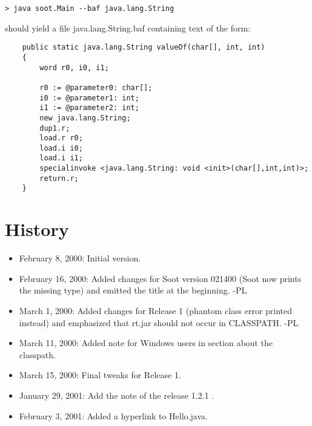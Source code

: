 \documentclass{article}
\begin{document}
\begin{verbatim}
> java soot.Main --baf java.lang.String
\end{verbatim}

should yield a file java.lang.String.baf containing text of the form:

\begin{verbatim}
    public static java.lang.String valueOf(char[], int, int)
    {
        word r0, i0, i1;

        r0 := @parameter0: char[];
        i0 := @parameter1: int;
        i1 := @parameter2: int;
        new java.lang.String;
        dup1.r;
        load.r r0;
        load.i i0;
        load.i i1;
        specialinvoke <java.lang.String: void <init>(char[],int,int)>;
        return.r;
    }
\end{verbatim}

\section{History}
\begin{itemize}
\item February 8, 2000: Initial version.

\item February 16, 2000: Added changes for Soot version 021400 (Soot now prints
the missing type) and emitted the title at the beginning. -PL

\item March 1, 2000: Added changes for Release 1 (phantom class error
printed instead) and emphasized that rt.jar should not occur in CLASSPATH. -PL

\item March 11, 2000: Added note for Windows users in section about the
classpath.

\item March 15, 2000: Final tweaks for Release 1.

\item January 29, 2001: Add the note of the release 1.2.1 .

\item February 3, 2001: Added a hyperlink to Hello.java.
\end{itemize}
\end{document}
